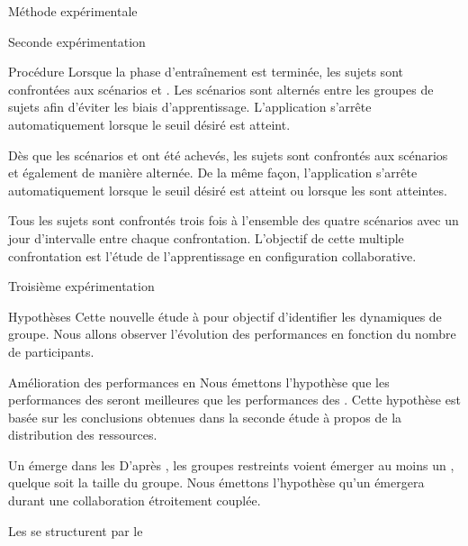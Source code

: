 \documentclass[myfrancais,ngerman,english,french]{mythesis}
\begin{document}
\begin{mychapter}{Méthode expérimentale}
\begin{mysection}{Seconde expérimentation}
\begin{mysubsection}{Procédure}
				Lorsque la phase d'entraînement est terminée, les sujets sont confrontées aux scénarios  et .
				Les scénarios sont alternés entre les groupes de sujets afin d'éviter les biais d'apprentissage.
				L'application s'arrête automatiquement lorsque le seuil  désiré est atteint.

				Dès que les scénarios  et  ont été achevés, les sujets sont confrontés aux scénarios  et  également de manière alternée.
				De la même façon, l'application s'arrête automatiquement lorsque le seuil  désiré est atteint ou lorsque les  sont atteintes.

				Tous les sujets sont confrontés trois fois à l'ensemble des quatre scénarios avec un jour d'intervalle entre chaque confrontation.
				L'objectif de cette multiple confrontation est l'étude de l'apprentissage en configuration collaborative.
			\end{mysubsection}
		\end{mysection}
		\begin{mysection}{Troisième expérimentation}
			\begin{mysubsection}{Hypothèses}
				Cette nouvelle étude à pour objectif d'identifier les dynamiques de groupe.
				Nous allons observer l'évolution des performances en fonction du nombre de participants.
				\begin{myparagraph}{ Amélioration des performances en }
					Nous émettons l'hypothèse que les performances des  seront meilleures que les performances des .
					Cette hypothèse est basée sur les conclusions obtenues dans la seconde étude à propos de la distribution des ressources.
				\end{myparagraph}
				\begin{myparagraph}{ Un  émerge dans les }
					D'après , les groupes restreints voient émerger au moins un , quelque soit la taille du groupe.
					Nous émettons l'hypothèse qu'un  émergera durant une collaboration étroitement couplée.
				\end{myparagraph}
				\begin{myparagraph}{ Les  se structurent par le \mybrainstorming}

\end{myparagraph}
\end{mysubsection}
\end{mysection}
\end{mychapter}
\end{document}
